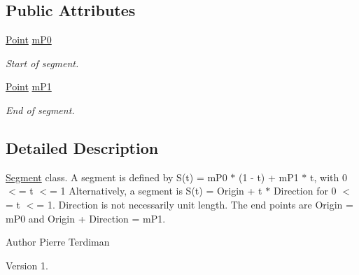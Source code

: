 \subsection*{Public Attributes}
\begin{DoxyCompactItemize}
\item 
\hypertarget{class_segment_a728fd28f0e3e55f6451191cb58e08ad4}{\hyperlink{class_point}{Point} \hyperlink{class_segment_a728fd28f0e3e55f6451191cb58e08ad4}{m\+P0}}\label{class_segment_a728fd28f0e3e55f6451191cb58e08ad4}

\begin{DoxyCompactList}\small\item\em Start of segment. \end{DoxyCompactList}\item 
\hypertarget{class_segment_adacb19db251a4bd1da51db8376e059cc}{\hyperlink{class_point}{Point} \hyperlink{class_segment_adacb19db251a4bd1da51db8376e059cc}{m\+P1}}\label{class_segment_adacb19db251a4bd1da51db8376e059cc}

\begin{DoxyCompactList}\small\item\em End of segment. \end{DoxyCompactList}\end{DoxyCompactItemize}


\subsection{Detailed Description}
\hyperlink{class_segment}{Segment} class. A segment is defined by S(t) = m\+P0 $\ast$ (1 -\/ t) + m\+P1 $\ast$ t, with 0 $<$= t $<$= 1 Alternatively, a segment is S(t) = Origin + t $\ast$ Direction for 0 $<$= t $<$= 1. Direction is not necessarily unit length. The end points are Origin = m\+P0 and Origin + Direction = m\+P1.

\begin{DoxyAuthor}{Author}
Pierre Terdiman 
\end{DoxyAuthor}
\begin{DoxyVersion}{Version}
1. 
\end{DoxyVersion}



